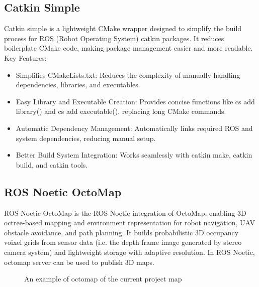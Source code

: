 \documentclass{article}
\begin{document}
\subsection{Catkin Simple}
Catkin simple is a lightweight CMake wrapper designed to simplify the build process for ROS (Robot Operating System) catkin packages. It reduces boilerplate CMake code, making package management easier and more readable.
Key Features:
\begin{itemize}
    \item Simplifies CMakeLists.txt: Reduces the complexity of manually handling dependencies, libraries, and executables.
    \item Easy Library and Executable Creation: Provides concise functions like cs add library() and cs add executable(), replacing long CMake commands.
    \item Automatic Dependency Management: Automatically links required ROS and system dependencies, reducing manual setup.
    \item Better Build System Integration: Works seamlessly with catkin make, catkin build, and catkin tools.
\end{itemize}

\subsection{ROS Noetic OctoMap}
ROS Noetic OctoMap is the ROS Noetic integration of OctoMap\cite{hornung13auro}, enabling 3D octree-based mapping and environment representation for robot navigation, UAV obstacle avoidance, and path planning. It builds probabilistic 3D occupancy voixel grids from sensor data (i.e. the depth frame image generated by stereo camera system) and lightweight storage with adaptive resolution. In ROS Noetic, octomap server can be used to publish 3D maps. 
\begin{figure}[h]
    \centering
    \caption{An example of octomap of the current project map}
    \label{fig:two_images}
\end{figure}
\end{document}
